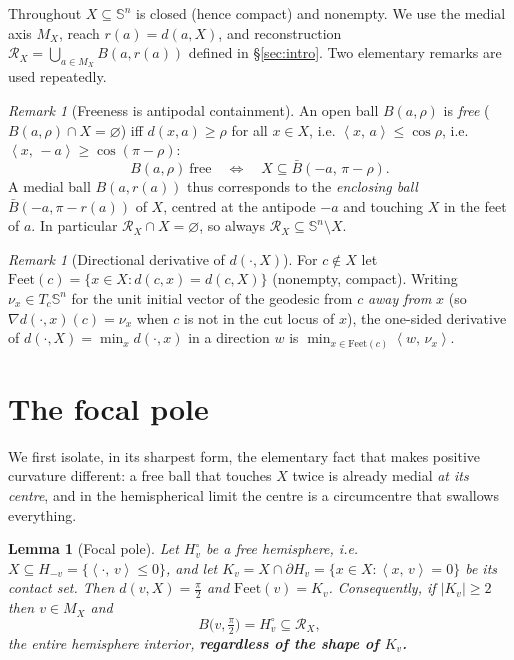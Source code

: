 \documentclass[11pt]{article}
\newtheorem{lemma}[theorem]{Lemma}
\theoremstyle{remark}
\newtheorem{remark}[theorem]{Remark}
\newcommand{\X}{X}
\newcommand{\Mx}{M_{\X}}
\newcommand{\Rx}{\mathcal{R}_{\X}}
\newcommand{\sca}[2]{\left\langle #1,\, #2\right\rangle}
\newcommand{\Sn}{\mathbb{S}^{n}}
\begin{document}
Throughout $\X\subseteq\Sn$ is closed (hence compact) and nonempty. We use
the medial axis $\Mx$, reach $r(a)=d(a,\X)$, and reconstruction
$\Rx=\bigcup_{a\in\Mx}B(a,r(a))$ defined in \S\ref{sec:intro}. Two
elementary remarks are used repeatedly.

\begin{remark}[Freeness is antipodal containment]\label{rem:dual}
An open ball $B(a,\rho)$ is \emph{free} ($B(a,\rho)\cap\X=\varnothing$)
iff $d(x,a)\ge\rho$ for all $x\in\X$, i.e. $\sca{x}{a}\le\cos\rho$, i.e.
$\sca{x}{-a}\ge\cos(\pi-\rho)$:
\[
  B(a,\rho)\ \text{free}\quad\Longleftrightarrow\quad
  \X\subseteq\bar B(-a,\,\pi-\rho).
\]
A medial ball $B(a,r(a))$ thus corresponds to the \emph{enclosing ball}
$\bar B(-a,\pi-r(a))$ of $\X$, centred at the antipode $-a$ and touching
$\X$ in the feet of $a$. In particular $\Rx\cap\X=\varnothing$, so always
$\Rx\subseteq\Sn\setminus\X$.
\end{remark}

\begin{remark}[Directional derivative of $d(\cdot,\X)$]\label{rem:dini}
For $c\notin\X$ let $\mathrm{Feet}(c)=\{x\in\X:d(c,x)=d(c,\X)\}$ (nonempty,
compact). Writing $\nu_{x}\in T_{c}\Sn$ for the unit initial vector of the
geodesic from $c$ \emph{away from} $x$ (so $\nabla d(\cdot,x)(c)=\nu_{x}$
when $c$ is not in the cut locus of $x$), the one-sided derivative of
$d(\cdot,\X)=\min_{x}d(\cdot,x)$ in a direction $w$ is
$\min_{x\in\mathrm{Feet}(c)}\sca{w}{\nu_{x}}$.
\end{remark}

\section{The focal pole}\label{sec:pole}

We first isolate, in its sharpest form, the elementary fact that makes
positive curvature different: a free ball that touches $\X$ twice is
already medial \emph{at its centre}, and in the hemispherical limit the
centre is a circumcentre that swallows everything.

\begin{lemma}[Focal pole]\label{lem:pole}
Let $H_{v}^{\circ}$ be a free hemisphere, i.e. $\X\subseteq H_{-v}=
\{\sca{\cdot}{v}\le0\}$, and let $K_{v}=\X\cap\partial H_{v}=
\{x\in\X:\sca{x}{v}=0\}$ be its contact set. Then $d(v,\X)=\tfrac\pi2$ and
$\mathrm{Feet}(v)=K_{v}$. Consequently, if $|K_{v}|\ge2$ then $v\in\Mx$
and
\[
  B\bigl(v,\tfrac\pi2\bigr)=H_{v}^{\circ}\subseteq\Rx,
\]
the entire hemisphere interior, \textbf{regardless of the shape of
$K_{v}$.}
\end{lemma}
\end{document}
